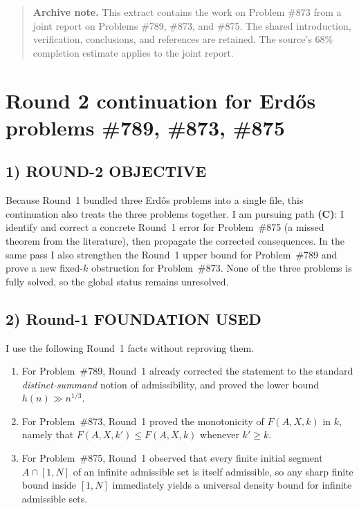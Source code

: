 \begin{quote}
\textbf{Archive note.} This extract contains the work on Problem \#873 from a joint report on Problems \#789, \#873, and \#875. The shared introduction, verification, conclusions, and references are retained. The source's 68\% completion estimate applies to the joint report.
\end{quote}

\section{Round 2 continuation for Erd\H{o}s problems \#789, \#873, \#875}

\subsection*{1) ROUND-2 OBJECTIVE}

Because Round~1 bundled three Erd\H{o}s problems into a single file, this continuation also treats the three problems together. I am pursuing path \textbf{(C)}: I identify and correct a concrete Round~1 error for Problem~\#875 (a missed theorem from the literature), then propagate the corrected consequences. In the same pass I also strengthen the Round~1 upper bound for Problem~\#789 and prove a new fixed-\(k\) obstruction for Problem~\#873. None of the three problems is fully solved, so the global status remains unresolved.

\subsection*{2) Round-1 FOUNDATION USED}

I use the following Round~1 facts without reproving them.

\begin{enumerate}
\item For Problem~\#789, Round~1 already corrected the statement to the standard \emph{distinct-summand} notion of admissibility, and proved the lower bound \(h(n) \gg n^{1/3}\).
\item For Problem~\#873, Round~1 proved the monotonicity of \(F(A,X,k)\) in \(k\), namely that \(F(A,X,k') \le F(A,X,k)\) whenever \(k'\ge k\).
\item For Problem~\#875, Round~1 observed that every finite initial segment \(A\cap [1,N]\) of an infinite admissible set is itself admissible, so any sharp finite bound inside \([1,N]\) immediately yields a universal density bound for infinite admissible sets.
\end{enumerate}

